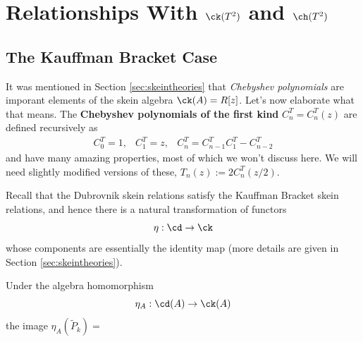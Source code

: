 \section{Relationships With $\ck(T^2)$ and $\ch(T^2)$}

\subsection{The Kauffman Bracket Case}

It was mentioned in Section \ref{sec:skeintheories} that \textit{Chebyshev polynomials} are imporant elements of the skein algebra $\ck(A) = R[z]$. Let's now elaborate what that means. The \textbf{Chebyshev polynomials of the first kind} $C^T_n = C^T_n(z)$ are defined recursively as
\begin{align*}
C^T_0 = 1, & C^T_1 = z, & C^T_n = C^T_{n-1} C^T_1 - C^T_{n-2}
\end{align*}
and have many amazing properties, most of which we won't discuss here. We will need slightly modified versions of these, $T_n(z) := 2C^T_n(z/2)$.  

Recall that the Dubrovnik skein relations satisfy the Kauffman Bracket skein relations, and hence there is a natural transformation of functors
\[
\eta: \cd \to \ck
\]
whose components are essentially the identity map (more details are given in Section \ref{sec:skeintheories}).

\begin{proposition}
Under the algebra homomorphism
\[
\eta_A: \cd(A) \to \ck(A)
\]
the image $\eta_A(\tilde{P}_k) = $
\end{proposition}


